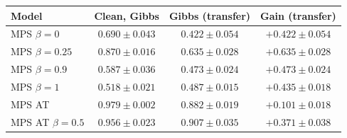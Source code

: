 \begin{tabular}{lccc}
\toprule
Model & Clean, Gibbs & Gibbs (transfer) & Gain (transfer) \\
\midrule
MPS $\beta=0$ & $0.690 \pm 0.043$ & $0.422 \pm 0.054$ & $+0.422 \pm 0.054$ \\
MPS $\beta=0.25$ & $0.870 \pm 0.016$ & $0.635 \pm 0.028$ & $+0.635 \pm 0.028$ \\
MPS $\beta=0.9$ & $0.587 \pm 0.036$ & $0.473 \pm 0.024$ & $+0.473 \pm 0.024$ \\
MPS $\beta=1$ & $0.518 \pm 0.021$ & $0.487 \pm 0.015$ & $+0.435 \pm 0.018$ \\
MPS AT & $0.979 \pm 0.002$ & $0.882 \pm 0.019$ & $+0.101 \pm 0.018$ \\
MPS AT $\beta=0.5$ & $0.956 \pm 0.023$ & $\mathbf{0.907 \pm 0.035}$ & $+0.371 \pm 0.038$ \\
\bottomrule
\end{tabular}
